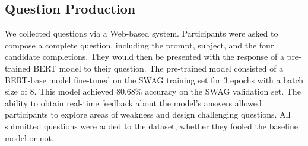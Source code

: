 \documentclass[11pt,a4paper]{article}
\begin{document}
    
    \subsection{Question Production}
    \label{sec:prod}
    We collected questions via a Web-based system. Participants were asked to compose a complete question, including the prompt, subject, and the four candidate completions. They would then be presented with the response of a pre-trained BERT model to their question. The pre-trained model consisted of a BERT-base model fine-tuned on the SWAG training set for 3 epochs with a batch size of 8. This model achieved 80.68\% accuracy on the SWAG validation set. The ability to obtain real-time feedback about the model's answers allowed participants to explore areas of weakness and design challenging questions. All submitted questions were added to the dataset, whether they fooled the baseline model or not.
    
\end{document}
